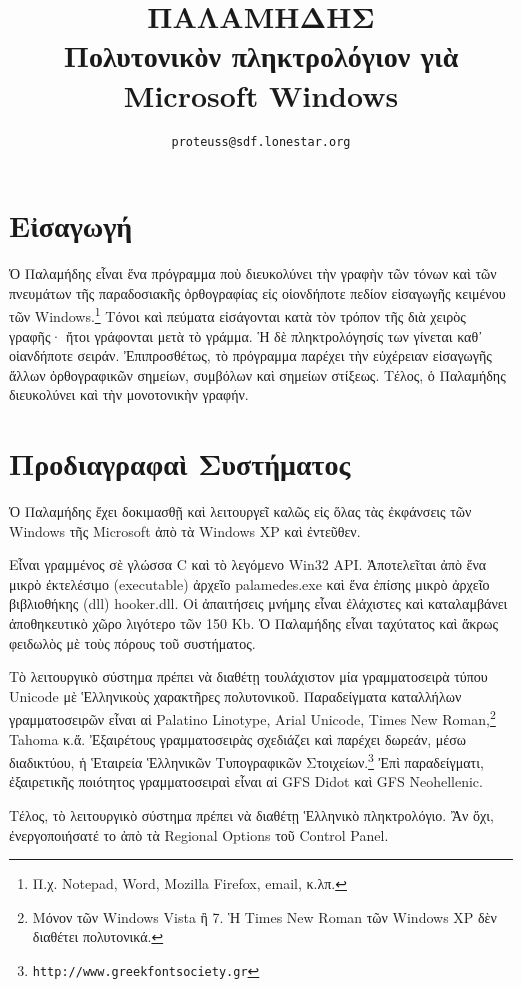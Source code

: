 \documentclass[12pt,a4paper]{article}
\title{ΠΑΛΑΜΗΔΗΣ\\{\small 
Πολυτονικὸν πληκτρολόγιον γιὰ Microsoft Windows
}}
\author{\tt {\small proteuss@sdf.lonestar.org}}
\date{}
\begin{document}
\maketitle
\section*{Εἰσαγωγή}

  Ὁ Παλαμήδης εἶναι ἕνα πρόγραμμα ποὺ διευκολύνει τὴν γραφὴν τῶν τόνων καὶ
  τῶν πνευμάτων τῆς παραδοσιακῆς ὀρθογραφίας εἰς οἱονδήποτε πεδίον εἰσαγωγῆς
  κειμένου τῶν Windows.\footnote{Π.χ. Notepad, Word, Mozilla Firefox, email, κ.λπ.}
  Τόνοι καὶ πεύματα εἰσάγονται
  κατὰ τὸν τρόπον τῆς διὰ χειρὸς γραφῆς· ἤτοι γράφονται μετὰ τὸ γράμμα. Ἡ δὲ
  πληκτρολόγησίς των γίνεται καθ᾽ οἱανδήποτε σειράν.  Ἐπιπροσθέτως, τὸ
  πρόγραμμα παρέχει τὴν εὐχέρειαν εἰσαγωγῆς ἄλλων ὀρθογραφικῶν
  σημείων, συμβόλων καὶ σημείων στίξεως. Τέλος, ὁ Παλαμήδης διευκολύνει
  καὶ τὴν μονοτονικὴν γραφήν.


\section*{Προδιαγραφαὶ Συστήματος}
%
  Ὁ Παλαμήδης ἔχει δοκιμασθῇ καὶ λειτουργεῖ καλῶς εἰς ὅλας τὰς ἐκφάνσεις
  τῶν Windows τῆς Microsoft ἀπὸ τὰ Windows XP καὶ ἐντεῦθεν.

  Εἶναι γραμμένος σὲ γλώσσα C καὶ τὸ λεγόμενο Win32 API.  Ἀποτελεῖται ἀπὸ
  ἕνα μικρὸ ἐκτελέσιμο (executable) ἀρχεῖο \textsf{palamedes.exe} καὶ ἕνα ἐπίσης
  μικρὸ ἀρχεῖο βιβλιοθήκης (dll) \textsf{hooker.dll}.  Οἱ ἀπαιτήσεις μνήμης εἶναι
  ἐλάχιστες καὶ καταλαμβάνει ἀποθηκευτικὸ χῶρο λιγότερο τῶν 150 Kb. 
  Ὁ Παλαμήδης εἶναι ταχύτατος καὶ ἄκρως φειδωλὸς μὲ τοὺς πόρους τοῦ συστήματος.

  Τὸ λειτουργικὸ σύστημα πρέπει νὰ διαθέτῃ τουλάχιστον μία γραμματοσειρὰ
  τύπου Unicode μὲ Ἑλληνικοὺς χαρακτῆρες πολυτονικοῦ.  Παραδείγματα
  καταλλήλων γραμματοσειρῶν εἶναι αἱ Palatino Linotype, Arial Unicode,
  Times New Roman,\footnote{Μόνον τῶν Windows Vista ἢ 7. Ἡ Times New Roman
  τῶν Windows XP δὲν διαθέτει πολυτονικά.} Tahoma κ.ἄ.  Ἐξαιρέτους
  γραμματοσειρὰς σχεδιάζει καὶ παρέχει δωρεάν, μέσω διαδικτύου, ἡ Ἑταιρεία
  Ἑλληνικῶν Τυπογραφικῶν
  Στοιχείων.\footnote{\texttt{http://www.greekfontsociety.gr}} Ἐπὶ παραδείγματι,
  ἐξαιρετικῆς ποιότητος γραμματοσειραὶ εἶναι αἱ GFS Didot καὶ GFS
  Neohellenic.

  Τέλος, τὸ λειτουργικὸ σύστημα πρέπει νὰ διαθέτῃ Ἑλληνικὸ πληκτρολόγιο.
  Ἂν ὄχι, ἐνεργοποιήσατέ το ἀπὸ τὰ Regional Options τοῦ Control Panel.
\end{document}
